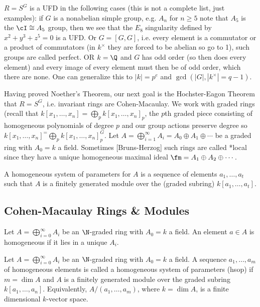 \begin{ex}
$R= S^G$ is a UFD in the following cases (this is not a complete list, just examples): if $G$ is a nonabelian simple group, e.g. $A_n$ for $n \geq 5$ note that $A_5$ is the $\cI \cong A_5$ group, then we see that the $E_8$ singularity defined by $x^2+y^3+z^5=0$ is a UFD. Or $G= [G,G]$, i.e. every element is a commutator or a product of commutators (in $k^\times$ they are forced to be abelian so go to 1), such groups are called perfect. OR $k= \Q$ and $G$ has odd order (so then does every element) and every image of every element must then be of odd order, which there are none. One can generalize this to $|k|= p^e$ and $\gcd(|G|,|k^\times|=q-1)$. 
\end{ex}


Having proved Noether's Theorem, our next goal is the Hochster-Eagon Theorem that $R= S^G$, i.e. invariant rings are Cohen-Macaulay. We work with graded rings (recall that $k[x_1,\ldots,x_n]= \bigoplus_p k[x_1,\ldots,x_n]_p$, the $p$th graded piece consisting of homogeneous polynomials of degree $p$ and our group actions preserve degree so $k[x_1,\ldots,x_n]^= \bigoplus_p k[x_1,\ldots,x_n]_p^G$. Let $A= \bigoplus_{i=1}^\infty A_i= A_0 \oplus A_1 \oplus \cdots$ be a graded ring with $A_0= k$ a field. Sometimes [Bruns-Herzog] such rings are called *local since they have a unique homogeneous maximal ideal $\fm= A_1 \oplus A_2 \oplus \cdots$. 


\begin{dfn}
A homogeneous system of parameters for $A$ is a sequence of elements $a_1,\ldots,a_t$ such that $A$ is a finitely generated module over the (graded subring) $k[a_1,\ldots,a_t]$. 
\end{dfn}








\subsection{Cohen-Macaulay Rings \& Modules}

\begin{dfn}[Homogeneous]
Let $A= \bigoplus_{i=0}^\infty A_i$ be an $\N$-graded ring with $A_0=k$ a field. An element $a \in A$ is homogeneous if it lies in a unique $A_i$.
\end{dfn}


\begin{dfn}
Let $A= \bigoplus_{i=0}^\infty A_i$ be an $\N$-graded ring with $A_0=k$ a field. A sequence $a_1,\ldots,a_m$ of homogeneous elements is called a homogeneous system of parameters (hsop) if $m = \dim A$ and $A$ is a finitely generated module over the graded subring $k[a_1,\ldots,a_n]$. Equivalently, $A/(a_1,\ldots,a_m)$, where $k= \dim A$, is a finite dimensional $k$-vector space. 
\end{dfn}


